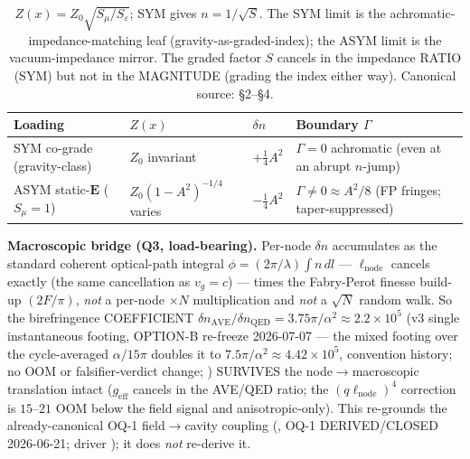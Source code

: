 \begin{table}[htbp]
\centering\footnotesize
\setlength{\tabcolsep}{4pt}
\begin{tabular}{@{}p{2.7cm} l l p{3.6cm}@{}}
\toprule
\textbf{Loading} & \textbf{$Z(x)$} & \textbf{$\delta n$} & \textbf{Boundary $\Gamma$} \\
\midrule
SYM co-grade (gravity-class) & $Z_0$ invariant & $+\tfrac14 A^2$ & $\Gamma=0$ achromatic (even at an abrupt $n$-jump) \\
ASYM static-$\mathbf E$ ($S_\mu{=}1$) & $Z_0(1{-}A^2)^{-1/4}$ varies & $-\tfrac14 A^2$ & $\Gamma\ne0\approx A^2/8$ (FP fringes; taper-suppressed) \\
\bottomrule
\end{tabular}
\caption{$Z(x)=Z_0\sqrt{S_\mu/S_\varepsilon}$; SYM gives $n=1/\sqrt{S}$. The SYM limit is the achromatic-impedance-matching leaf (gravity-as-graded-index); the ASYM limit is the vacuum-impedance mirror. The graded factor $S$ cancels in the impedance RATIO (SYM) but not in the MAGNITUDE (grading the index either way). Canonical source:  \S2--\S4.}
\label{tab:vol9_graded_network_regimes}
\end{table}

\medskip\noindent\textbf{Macroscopic bridge (Q3, load-bearing).} Per-node $\delta n$ accumulates as the standard coherent optical-path integral $\phi=(2\pi/\lambda)\int n\,dl$ --- $\ell_{\mathrm{node}}$ cancels exactly (the same cancellation as $v_g=c$) --- times the Fabry-Perot finesse build-up $(2F/\pi)$, \emph{not} a per-node $\times N$ multiplication and \emph{not} a $\sqrt{N}$ random walk. So the birefringence COEFFICIENT $\delta n_{\mathrm{AVE}}/\delta n_{\mathrm{QED}}=3.75\pi/\alpha^2\approx2.2\times10^5$ (v3 single instantaneous footing, OPTION-B re-freeze 2026-07-07 --- the mixed footing over the cycle-averaged $\alpha/15\pi$ doubles it to $7.5\pi/\alpha^2\approx4.42\times10^5$, convention history; no OOM or falsifier-verdict change; ) SURVIVES the node$\to$macroscopic translation intact ($g_{\mathrm{eff}}$ cancels in the AVE/QED ratio; the $(q\ell_{\mathrm{node}})^4$ correction is $15$--$21$ OOM below the field signal and anisotropic-only). This re-grounds the already-canonical OQ-1 field$\to$cavity coupling (, OQ-1 DERIVED/CLOSED 2026-06-21; driver \texttt{}); it does \emph{not} re-derive it.

